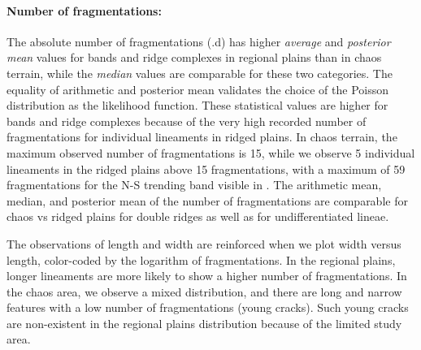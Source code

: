 \paragraph{Number of fragmentations:}
The absolute number of fragmentations (.d) has higher \textit{average} and \textit{posterior mean} values for bands and ridge complexes in regional plains than in chaos terrain, while the \textit{median} values are comparable for these two categories. The equality of arithmetic and posterior mean validates the choice of the Poisson distribution as the likelihood function. These statistical values are higher for bands and ridge complexes because of the very high recorded number of fragmentations for individual lineaments in ridged plains. In chaos terrain, the maximum observed number of fragmentations is 15, while we observe 5 individual lineaments in the ridged plains above 15 fragmentations, with a maximum of 59 fragmentations for the N-S trending band visible in .
The arithmetic mean, median, and posterior mean of the number of fragmentations are comparable for chaos vs ridged plains for double ridges as well as for undifferentiated lineae. 

The observations of length and width are reinforced when we plot width versus length, color-coded by the logarithm of fragmentations. 
In the regional plains, longer lineaments are more likely to show a higher number of fragmentations.
In the chaos area, we observe a mixed distribution, and there are long and narrow features with a low number of fragmentations (young cracks). Such young cracks are non-existent in the regional plains distribution because of the limited study area. 

